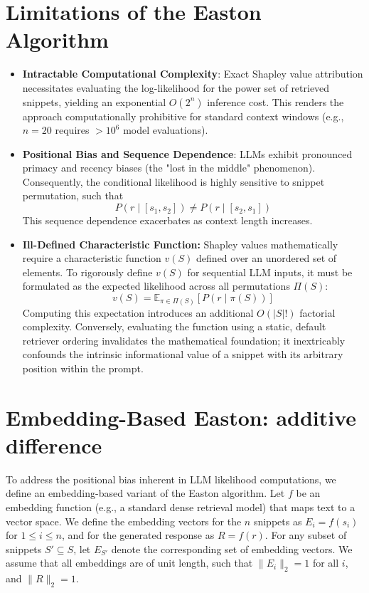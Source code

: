 \documentclass{article}
\begin{document}
\section{Limitations of the Easton Algorithm}
\begin{itemize}
    \item {\bf Intractable Computational Complexity}: Exact Shapley value attribution necessitates evaluating the log-likelihood for the power set of retrieved snippets, yielding an exponential $O(2^n)$ inference cost. This renders the approach computationally prohibitive for standard context windows (e.g., $n=20$ requires $>10^6$ model evaluations).
    \item {\bf Positional Bias and Sequence Dependence}: LLMs exhibit pronounced primacy and recency biases (the "lost in the middle" phenomenon). Consequently, the conditional likelihood is highly sensitive to snippet permutation, such that 
    $$P(r \mid [s_1, s_2]) \neq P(r \mid [s_2, s_1])$$
    This sequence dependence exacerbates as context length increases.
    \item {\bf Ill-Defined Characteristic Function:}
    Shapley values mathematically require a characteristic function $v(S)$ defined over an unordered set of elements. To rigorously define $v(S)$ for sequential LLM inputs, it must be formulated as the expected likelihood across all permutations $\Pi (S)$:
    $$v(S) = \mathbb{E}_{\pi \in \Pi(S)} [ P(r \mid \pi(S)) ]$$
    Computing this expectation introduces an additional $O(\vert S \vert !)$ factorial complexity. Conversely, evaluating the function using a static, default retriever ordering invalidates the mathematical foundation; it inextricably confounds the intrinsic informational value of a snippet with its arbitrary position within the prompt.
\end{itemize}


\section{Embedding-Based Easton: additive difference}

To address the positional bias inherent in LLM likelihood computations, we define an embedding-based variant of the Easton algorithm. Let $f$ be an embedding function (e.g., a standard dense retrieval model) that maps text to a vector space. We define the embedding vectors for the $n$ snippets as $E_i = f(s_i)$ for $1 \le i \le n$, and for the generated response as $R = f(r)$. For any subset of snippets $S' \subseteq S$, let $E_{S'}$ denote the corresponding set of embedding vectors. We assume that all embeddings are of unit length, such that $\|E_i\|_2 = 1$ for all $i$, and $\|R\|_2 = 1$.
\end{document}
